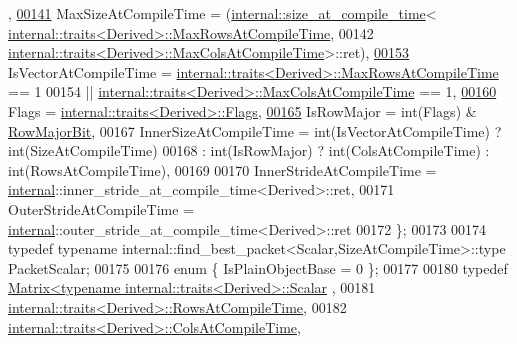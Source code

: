 \begin{DoxyCode}
      ,
\hyperlink{group___core___module_a9784b8701c2d1c79fa8000e1b3ebdb8ba33a400a0af92cc6082d056e3c9991fe1}{00141}       MaxSizeAtCompileTime = (\hyperlink{struct_eigen_1_1internal_1_1size__at__compile__time}{internal::size\_at\_compile\_time}<
      \hyperlink{struct_eigen_1_1internal_1_1traits}{internal::traits<Derived>::MaxRowsAtCompileTime},
00142                                                       
      \hyperlink{struct_eigen_1_1internal_1_1traits}{internal::traits<Derived>::MaxColsAtCompileTime}>::ret),
\hyperlink{group___core___module_a9784b8701c2d1c79fa8000e1b3ebdb8ba9ffdecbd2ad769f385c6a61ca852d810}{00153}       IsVectorAtCompileTime = \hyperlink{struct_eigen_1_1internal_1_1traits}{internal::traits<Derived>::MaxRowsAtCompileTime}
       == 1
00154                            || \hyperlink{struct_eigen_1_1internal_1_1traits}{internal::traits<Derived>::MaxColsAtCompileTime}
       == 1,
\hyperlink{group___core___module_a9784b8701c2d1c79fa8000e1b3ebdb8baba17ecd6acac1351b99647317b211148}{00160}       Flags = \hyperlink{struct_eigen_1_1internal_1_1traits}{internal::traits<Derived>::Flags},
\hyperlink{group___core___module_a9784b8701c2d1c79fa8000e1b3ebdb8baff2add9b7e8426ba05be33f32806d21c}{00165}       IsRowMajor = int(Flags) & \hyperlink{group__flags_gae4f56c2a60bbe4bd2e44c5b19cbe8762}{RowMajorBit}, 
00167       InnerSizeAtCompileTime = int(IsVectorAtCompileTime) ? int(SizeAtCompileTime)
00168                              : int(IsRowMajor) ? int(ColsAtCompileTime) : int(RowsAtCompileTime),
00169 
00170       InnerStrideAtCompileTime = \hyperlink{namespaceinternal}{internal}::inner\_stride\_at\_compile\_time<Derived>::ret,
00171       OuterStrideAtCompileTime = \hyperlink{namespaceinternal}{internal}::outer\_stride\_at\_compile\_time<Derived>::ret
00172     \};
00173     
00174     \textcolor{keyword}{typedef} \textcolor{keyword}{typename} internal::find\_best\_packet<Scalar,SizeAtCompileTime>::type PacketScalar;
00175 
00176     \textcolor{keyword}{enum} \{ IsPlainObjectBase = 0 \};
00177     
00180     \textcolor{keyword}{typedef} \hyperlink{group___core___module_class_eigen_1_1_matrix}{Matrix<typename internal::traits<Derived>::Scalar}
      ,
00181                 \hyperlink{struct_eigen_1_1internal_1_1traits}{internal::traits<Derived>::RowsAtCompileTime},
00182                 \hyperlink{struct_eigen_1_1internal_1_1traits}{internal::traits<Derived>::ColsAtCompileTime},

\end{DoxyCode}
